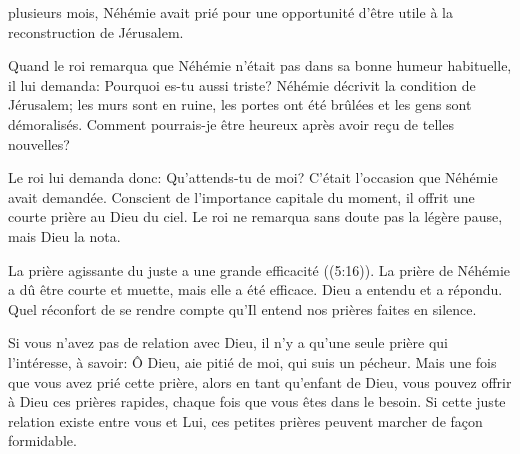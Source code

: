 \dvrule






 plusieurs mois, Néhémie avait prié
 pour une opportunité d'être utile à la reconstruction de Jérusalem.

Quand le roi remarqua que Néhémie n'était pas dans sa bonne humeur habituelle,
 il lui demanda\space: \og Pourquoi es-tu aussi triste? \fg{}
 Néhémie décrivit la condition de Jérusalem\thinspace; les murs sont en ruine,
 les portes ont été brûlées et les gens sont démoralisés.
 \og Comment pourrais-je être heureux après avoir reçu de telles nouvelles? \fg{}

Le roi lui demanda donc\space: \og Qu'attends-tu de moi? \fg{}
 C'était l'occasion que Néhémie avait demandée.
 Conscient de l'importance capitale du moment,
 il offrit une courte prière au Dieu du ciel.
 Le roi ne remarqua sans doute pas la légère pause, mais Dieu la nota.


\og La prière agissante du juste a une grande efficacité \fg{}
 ((5:16)).
 La prière de Néhémie a dû être courte et muette, mais elle a été efficace.
 Dieu a entendu et a répondu.
 Quel réconfort de se rendre compte qu'Il entend nos prières faites en silence.

Si vous n'avez pas de relation avec Dieu, il n'y a qu'une seule prière
 qui l'intéresse, à savoir\space:
 \og Ô Dieu, aie pitié de moi, qui suis un pécheur. \fg{}
 Mais une fois que vous avez prié cette prière, alors en tant qu'enfant de Dieu,
 vous pouvez offrir à Dieu ces prières rapides,
 chaque fois que vous êtes dans le besoin.
 Si cette juste relation existe entre vous et Lui,
 ces petites prières peuvent marcher de façon formidable. 

\dvrule



